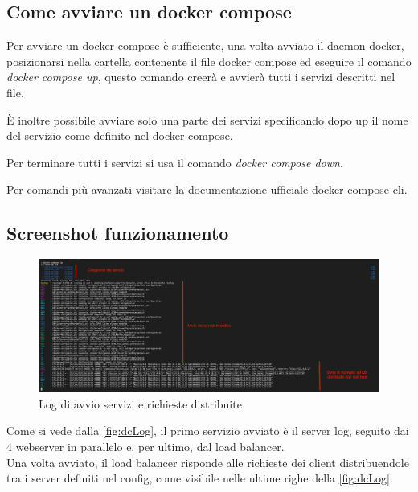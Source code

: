 \documentclass[../DocumentazioneProgetto.tex]{subfiles}
\begin{document}
	\subsection{Come avviare un docker compose} 
	Per avviare un docker compose è sufficiente, una volta avviato il daemon docker, posizionarsi nella cartella contenente il file docker compose ed eseguire 
	il comando \textit{docker compose up}, questo comando creerà e avvierà tutti i servizi descritti nel file. 

	È inoltre possibile avviare solo una parte dei servizi specificando dopo up il nome del servizio come definito nel docker compose.

	Per terminare tutti i servizi si usa il comando \textit{docker compose down}.

	Per comandi più avanzati visitare la \href{https://docs.docker.com/compose/reference/}{documentazione ufficiale docker compose cli}.

	\subsection{Screenshot funzionamento} 
	\begin{figure}[ht]
		\includegraphics[width=15cm]{images/dcLog.png}
		\centering
		\caption{Log di avvio servizi e richieste distribuite}
		\label{fig:dcLog}
	\end{figure}
	Come si vede dalla \autoref{fig:dcLog}, il primo servizio avviato è il server log, seguito dai 4 webserver in parallelo e, per ultimo, dal load balancer.\\
	Una volta avviato, il load balancer risponde alle richieste dei client distribuendole tra i server definiti nel config, come visibile nelle ultime righe della \autoref{fig:dcLog}.
\end{document}
